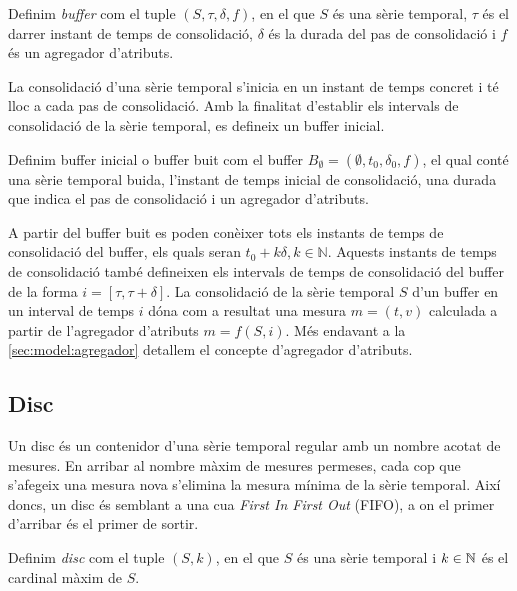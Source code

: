 \begin{definition}[Buffer]
  Definim \emph{buffer} com el tuple $(S,\tau,\delta,f)$, en el que
  $S$ és una sèrie temporal, $\tau$ és el darrer instant de temps de
  consolidació, $\delta$ és la durada del pas de consolidació i $f$ és
  un agregador d'atributs.
\end{definition}

La consolidació d'una sèrie temporal s'inicia en un instant de temps
concret i té lloc a cada pas de consolidació. Amb la finalitat
d'establir els intervals de consolidació de la sèrie temporal, es
defineix un buffer inicial.

\begin{definition}\label{def:model:buffer_buit}
  Definim buffer inicial o buffer buit com el buffer $B_{\emptyset} =
  (\emptyset,t_0, \delta_0, f)$, el qual
  conté una sèrie temporal buida, l'instant de temps inicial de
  consolidació, una durada que indica el pas de consolidació i un
  agregador d'atributs.
\end{definition}

A partir del buffer buit es poden conèixer tots els instants de temps
de consolidació del buffer, els quals seran $t_0+k\delta,
k\in\mathbb{N}$. Aquests instants de temps de consolidació també
defineixen els intervals de temps de consolidació del buffer de la
forma $i=[\tau,\tau+\delta]$. La consolidació de la sèrie temporal $S$
d'un buffer en un interval de temps $i$ dóna com a resultat una mesura
$m=(t,v)$ calculada a partir de l'agregador d'atributs $m = f (S,
i)$. Més endavant a la \autoref{sec:model:agregador} detallem el
concepte d'agregador d'atributs.








\subsection{Disc}\label{sec:model:disc}

Un disc és un contenidor d'una sèrie temporal regular amb un nombre
acotat de mesures. En arribar al nombre màxim de mesures permeses,
cada cop que s'afegeix una mesura nova s'elimina la mesura mínima de
la sèrie temporal.  Així doncs, un disc és semblant a una cua
\emph{First In First Out} (FIFO), a on el primer d'arribar és el
primer de sortir.

\begin{definition}[Disc]
  Definim \emph{disc} com el tuple $(S,k)$, en el que $S$
  és una sèrie temporal i $k\in\mathbb{N}{}$ és el cardinal màxim de $S$.
\end{definition}

